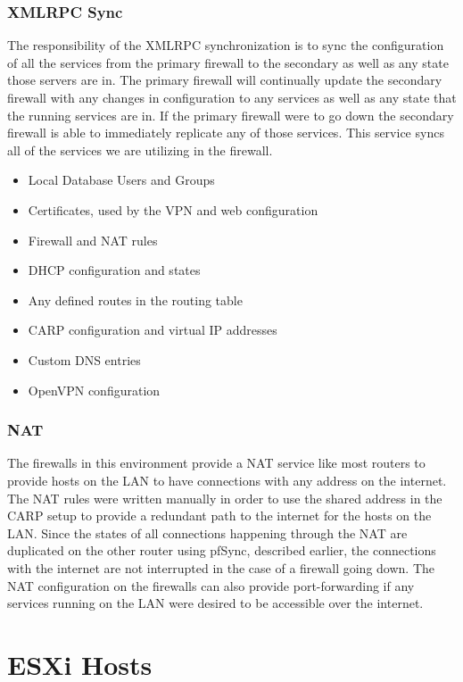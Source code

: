 \documentclass[12pt]{IEEEtran}
\begin{document}
\subsubsection{XMLRPC Sync}
The responsibility of the XMLRPC synchronization is to sync the configuration of all the services from the primary firewall to the secondary as well as any state those servers are in.
The primary firewall will continually update the secondary firewall with any changes in configuration to any services as well as any state that the running services are in.
If the primary firewall were to go down the secondary firewall is able to immediately replicate any of those services. 
This service syncs all of the services we are utilizing in the firewall. 
\begin{itemize}
\item Local Database Users and Groups
\item Certificates, used by the VPN and web configuration
\item Firewall and NAT rules
\item DHCP configuration and states
\item Any defined routes in the routing table
\item CARP configuration and virtual IP addresses
\item Custom DNS entries
\item OpenVPN configuration
\end{itemize}

\subsubsection{NAT}
The firewalls in this environment provide a NAT service like most routers to provide hosts on the LAN to have connections with any address on the internet. 
The NAT rules were written manually in order to use the shared address in the CARP setup to provide a redundant path to the internet for the hosts on the LAN.
Since the states of all connections happening through the NAT are duplicated on the other router using pfSync, described earlier, the connections with the internet are not interrupted in the case of a firewall going down. 
The NAT configuration on the firewalls can also provide port-forwarding if any services running on the LAN were desired to be accessible over the internet.  

\section{ESXi Hosts}

\end{document}
